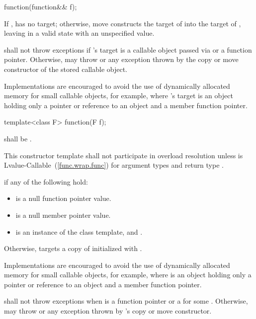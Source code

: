 %
\begin{itemdecl}
function(function&& f);
\end{itemdecl}

\begin{itemdescr}
\pnum
\effects If ,  has
no target; otherwise, move constructs the target of 
into the target of , leaving  in
a valid state with an unspecified value.

\pnum
\throws shall not throw exceptions if 's target is
a callable object passed via  or
a function pointer. Otherwise, may throw  or
any exception thrown by the copy or move constructor
of the stored callable object.
\begin{note} Implementations are encouraged to avoid the use of
dynamically allocated memory for small callable objects, for example,
where 's target is an object holding only a pointer or reference
to an object and a member function pointer. \end{note}
\end{itemdescr}

%
\begin{itemdecl}
template<class F> function(F f);
\end{itemdecl}

\begin{itemdescr}
\pnum
\requires {} shall be .

\pnum
\remarks This constructor template shall not participate in overload resolution unless
 is Lvalue-Callable~(\ref{func.wrap.func}) for argument types
 and return type .

\pnum
\postconditions {} if any of the following hold:
\begin{itemize}
\item {} is a null function pointer value.
\item {} is a null member pointer value.
\item {} is an instance of the  class template, and
  .
\end{itemize}

\pnum
Otherwise,  targets a copy of 
initialized with .
\begin{note} Implementations are encouraged to avoid the use of
dynamically allocated memory for small callable objects, for example,
where  is an object holding only a pointer or
reference to an object and a member function pointer. \end{note}

\pnum
\throws shall not throw exceptions when  is a function pointer
or a  for some . Otherwise,
may throw  or any exception thrown by 's copy
or move constructor.
\end{itemdescr}

